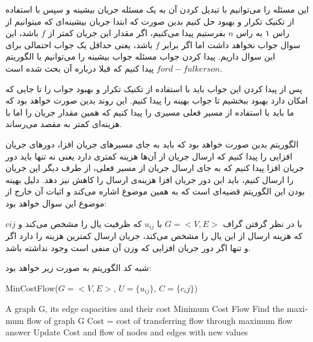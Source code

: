 \documentclass[]{article}
\begin{document}
این مسئله را می‌توانیم با تبدیل کردن آن به یک مسئله جریان بیشینه و سپس با استفاده از
تکنیک تکرار و بهبود حل کنیم بدین صورت که ابتدا جریان بیشینه‌ای که میتوانیم از راس ۱ به راس $n$
بفرستیم پیدا می‌کنیم، اگر مقدار این جریان کمتر از $f$ باشد، این سوال جواب نخواهد داشت
اما اگر برابر $f$ باشد، یعنی حداقل یک جواب احتمالی برای این سوال داریم.
پیدا کردن جواب مسئله جواب بیشینه را می‌توانیم با الگوریتم $ford-fulkerson$
پیدا کنیم که قبلا درباره آن بحث شده است.

پس از پیدا کردن این جواب باید با استفاده از تکنیک تکرار و بهبود جواب را تا جایی که
امکان دارد بهبود ببخشیم تا جواب بهینه را پیدا کنیم. این روند بدین صورت خواهد بود که ما باید
با استفاده از مسیر فعلی مسیری را پیدا کنیم که همین مقدار جریان را اما با هزینه‌ای کمتر به مقصد می‌رساند.

الگوریتم بدین صورت خواهد بود که باید به جای مسیر‌های جریان افزا، دور‌های جریان افزایی را
پیدا کنیم که ارسال جریان از آن‌ها هزینه کمتری دارد یعنی نه تنها باید دور جریان افزا پیدا کنیم که به جای
ارسال جریان از مسیر فعلی، از طرف دیگر این جریان را ارسال کنیم، باید این دور جریان افزا
هزینه‌ی ارسال را کاهش نیز دهد. دلیل بهینه بودن این الگوریتم قضیه‌ای است که به همین موضوع اشاره می‌کند
و اثبات آن خارج از موضوع این سوال خواهد بود:

با در نظر گرفتن گراف $G = <V, E>$ با $u_{ij}$ که ظرفیت یال را مشخص می‌کند و $c{ij}$
که هزینه ارسال از این یال را مشخص می‌کند، جریان ارسال کمترین هزینه را دارد اگر و تنها اگر 
دور جریان افزایی که وزن آن منفی است وجود نداشته باشد.

شبه کد الگوریتم به صورت زیر خواهد بود:
\begin{latin}
    \begin{algorithm}[H]
        \caption*{MinCostFlow($G = <V, E>$, $U = \lbrace u_{ij} \rbrace$, $C = \lbrace c_ij \rbrace$)}
        \begin{algorithmic}
            \Require A graph G, its edge capacities and their cost
            \Ensure Minimum Cost Flow
            \State Find the maximum flow of graph G
            \State Cost = cost of transferring flow through maximum flow answer
                \State Update Cost and flow of nodes and edges with new values
            \EndWhile
        \end{algorithmic}
    \end{algorithm}
\end{latin}
\end{document}
